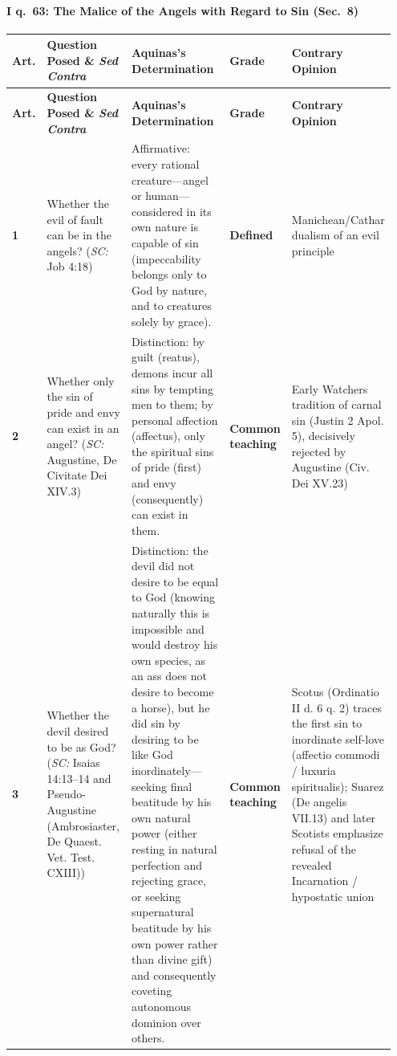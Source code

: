\paragraph{I q.~63: The Malice of the Angels with Regard to Sin (Sec.~8)}
{\scriptsize
\setlength{\tabcolsep}{2.5pt}
\renewcommand{\arraystretch}{1.15}
\begin{longtable}{>{\raggedright\arraybackslash}p{0.05\linewidth}>{\raggedright\arraybackslash}p{0.23\linewidth}>{\raggedright\arraybackslash}p{0.31\linewidth}>{\raggedright\arraybackslash}p{0.12\linewidth}>{\raggedright\arraybackslash}p{0.24\linewidth}}
\toprule
\textbf{Art.} & \textbf{Question Posed \& \emph{Sed Contra}} & \textbf{Aquinas's Determination} & \textbf{Grade} & \textbf{Contrary Opinion} \\
\midrule
\endfirsthead
\toprule
\textbf{Art.} & \textbf{Question Posed \& \emph{Sed Contra}} & \textbf{Aquinas's Determination} & \textbf{Grade} & \textbf{Contrary Opinion} \\
\midrule
\endhead
\bottomrule
\endfoot
\textbf{1} & Whether the evil of fault can be in the angels? (\emph{SC:} Job 4:18) & Affirmative: every rational creature---angel or human---considered in its own nature is capable of sin (impeccability belongs only to God by nature, and to creatures solely by grace). & \textbf{Defined} & Manichean/Cathar dualism of an evil principle \\
\addlinespace[1.5pt]
\textbf{2} & Whether only the sin of pride and envy can exist in an angel? (\emph{SC:} Augustine, De Civitate Dei XIV.3) & Distinction: by guilt (reatus), demons incur all sins by tempting men to them; by personal affection (affectus), only the spiritual sins of pride (first) and envy (consequently) can exist in them. & \textbf{Common teaching} & Early Watchers tradition of carnal sin (Justin 2 Apol. 5), decisively rejected by Augustine (Civ. Dei XV.23) \\
\addlinespace[1.5pt]
\textbf{3} & Whether the devil desired to be as God? (\emph{SC:} Isaias 14:13--14 and Pseudo-Augustine (Ambrosiaster, De Quaest. Vet. Test. CXIII)) & Distinction: the devil did not desire to be equal to God (knowing naturally this is impossible and would destroy his own species, as an ass does not desire to become a horse), but he did sin by desiring to be like God inordinately---seeking final beatitude by his own natural power (either resting in natural perfection and rejecting grace, or seeking supernatural beatitude by his own power rather than divine gift) and consequently coveting autonomous dominion over others. & \textbf{Common teaching} & Scotus (Ordinatio II d. 6 q. 2) traces the first sin to inordinate self-love (affectio commodi / luxuria spiritualis); Suarez (De angelis VII.13) and later Scotists emphasize refusal of the revealed Incarnation / hypostatic union \\

\end{longtable}}
